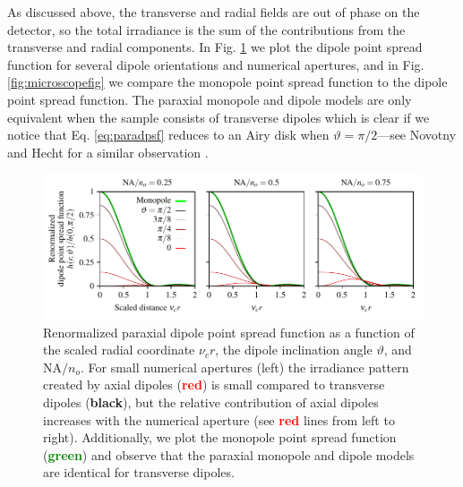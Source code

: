 \documentclass[]{osa-article}
\begin{document}
As discussed above, the transverse and radial fields are out of phase on the
detector, so the total irradiance is the sum of the contributions from the
transverse and radial components. In Fig. \ref{fig:hdet} we plot the dipole
point spread function for several dipole orientations and numerical apertures,
and in Fig. \ref{fig:microscopefig} we compare the monopole point spread
function to the dipole point spread function. The paraxial monopole and dipole
models are only equivalent when the sample consists of transverse dipoles which
is clear if we notice that Eq. \eqref{eq:paradpsf} reduces to an Airy disk when
$\vartheta = \pi/2$---see Novotny and Hecht for a similar observation
\cite[ch.~4]{nov2006}.

\begin{figure}[h]
 \centering
   \centering
   \includegraphics[scale=0.8]{../figures/paratfs/dpsf.pdf}
   \caption{Renormalized paraxial dipole point spread function as a function of
     the scaled radial coordinate $\nu_c r$, the dipole inclination angle
     $\vartheta$, and $\text{NA}/n_o$. For small numerical apertures (left) the
     irradiance pattern created by axial dipoles (\textcolor{red}{\textbf{red}})
     is small compared to transverse dipoles (\textbf{black}), but the relative
     contribution of axial dipoles increases with the numerical aperture (see
     \textcolor{red}{\textbf{red}} lines from left to right). Additionally, we
     plot the monopole point spread function (\textcolor{green}{\textbf{green}})
     and observe that the paraxial monopole and dipole models are identical for
     transverse dipoles.}
   \label{fig:hdet}
 \end{figure}
 
\end{document}
